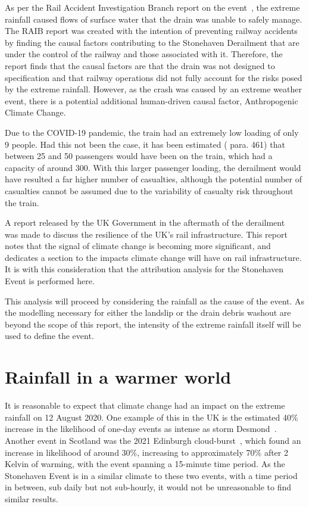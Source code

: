 \documentclass[12pt,a4paper,openany]{report}
\begin{document}
As per the Rail Accident Investigation Branch report on the event~\cite{RAIB_2022},
    the extreme rainfall caused flows of surface water that the drain was unable to safely manage.
The RAIB report was created with the intention of preventing railway accidents by finding the causal
    factors contributing to the Stonehaven Derailment that are under the control of the railway
    and those associated with it.
Therefore,
    the report finds that the causal factors are that the drain was not designed to specification
    and that railway operations did not fully account for the risks posed by the extreme rainfall.
However,
    as the crash was caused by an extreme weather event,
    there is a potential additional human-driven causal factor, Anthropogenic Climate Change.

Due to the COVID-19 pandemic,
    the train had an extremely low loading of only 9 people.
Had this not been the case,
    it has been estimated (\cite{RAIB_2022} para. 461) that between 25 and 50 passengers would have been on the train,
    which had a capacity of around 300.
With this larger passenger loading,
    the derailment would have resulted a far higher number of casualties,
    although the potential number of casualties cannot be assumed due to the variability of casualty risk throughout the train.

A report released by the UK Government in the aftermath of the derailment~\cite{NR_DfT_2021}
    was made to discuss the resilience of the UK's rail infrastructure.
This report notes that the signal of climate change is becoming more significant,
    and dedicates a section to the impacts climate change will have on rail infrastructure.
It is with this consideration that the attribution analysis for the Stonehaven Event is performed here.

This analysis will proceed by considering the rainfall as the cause of the event.
As the modelling necessary for either the landslip or the drain debris washout are beyond the scope of this report,
    the intensity of the extreme rainfall itself will be used to define the event.

\section{Rainfall in a warmer world}\label{sec:warmerrainfall}

It is reasonable to expect that climate change had an impact on the extreme rainfall on 12 August 2020.
One example of this in the UK is the estimated 40\% increase
    in the likelihood of one-day events as intense as storm Desmond~\cite{Desmond_2015}.
Another event in Scotland was the 2021 Edinburgh cloud-burst~\cite{Tett_Soon},
    which found an increase in likelihood of around 30\%,
    increasing to approximately 70\% after 2 Kelvin of warming,
    with the event spanning a 15-minute time period.
As the Stonehaven Event is in a similar climate to these two events,
    with a time period in between,
    sub daily but not sub-hourly,
    it would not be unreasonable to find similar results.
\end{document}
